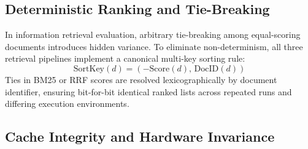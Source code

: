 \subsection{Deterministic Ranking and Tie-Breaking}
In information retrieval evaluation, arbitrary tie-breaking among equal-scoring documents introduces hidden variance. To eliminate non-determinism, all three retrieval pipelines implement a canonical multi-key sorting rule:
\begin{equation}
    \text{SortKey}(d) = (-\text{Score}(d), \, \text{DocID}(d))
\end{equation}
Ties in BM25 or RRF scores are resolved lexicographically by document identifier, ensuring bit-for-bit identical ranked lists across repeated runs and differing execution environments.

\subsection{Cache Integrity and Hardware Invariance}
